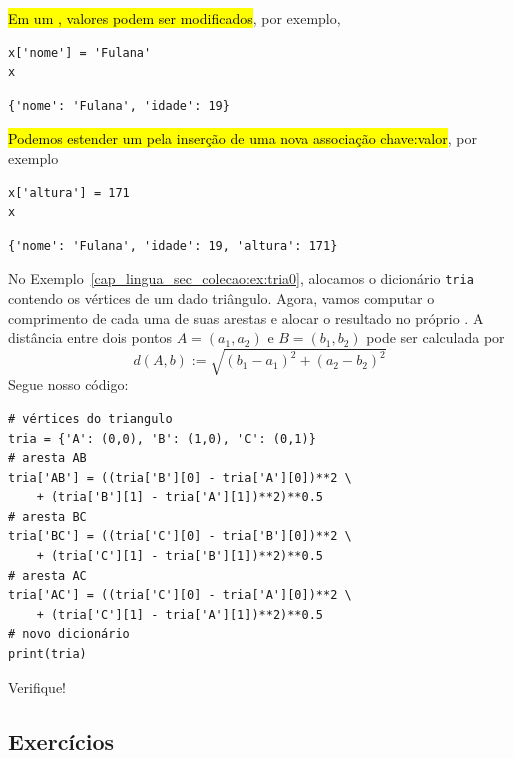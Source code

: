 \hl{Em um {\PYTHONdict}, valores podem ser modificados}, por exemplo,

\begin{lstlisting}
x['nome'] = 'Fulana'
x
\end{lstlisting}

\begin{verbatim}
{'nome': 'Fulana', 'idade': 19}
\end{verbatim}

\hl{Podemos estender um {\PYTHONdict} pela inserção de uma nova associação chave:valor}, por exemplo

\begin{lstlisting}
x['altura'] = 171
x
\end{lstlisting}

\begin{verbatim}
{'nome': 'Fulana', 'idade': 19, 'altura': 171}
\end{verbatim}

\begin{ex}
  No Exemplo~\ref{cap_lingua_sec_colecao:ex:tria0}, alocamos o dicionário \texttt{tria} contendo os vértices de um dado triângulo. Agora, vamos computar o comprimento de cada uma de suas arestas e alocar o resultado no próprio {\PYTHONdict}. A distância entre dois pontos $A = (a_1, a_2)$ e $B = (b_1, b_2)$ pode ser calculada por
  \begin{equation}
    d(A, b) := \sqrt{(b_1-a_1)^2 + (a_2-b_2)^2}
  \end{equation}
  Segue nosso código:

\begin{lstlisting}
# vértices do triangulo
tria = {'A': (0,0), 'B': (1,0), 'C': (0,1)}
# aresta AB
tria['AB'] = ((tria['B'][0] - tria['A'][0])**2 \
    + (tria['B'][1] - tria['A'][1])**2)**0.5
# aresta BC
tria['BC'] = ((tria['C'][0] - tria['B'][0])**2 \
    + (tria['C'][1] - tria['B'][1])**2)**0.5
# aresta AC
tria['AC'] = ((tria['C'][0] - tria['A'][0])**2 \
    + (tria['C'][1] - tria['A'][1])**2)**0.5
# novo dicionário
print(tria)
\end{lstlisting}

Verifique!

\end{ex}

\subsection{Exercícios}


